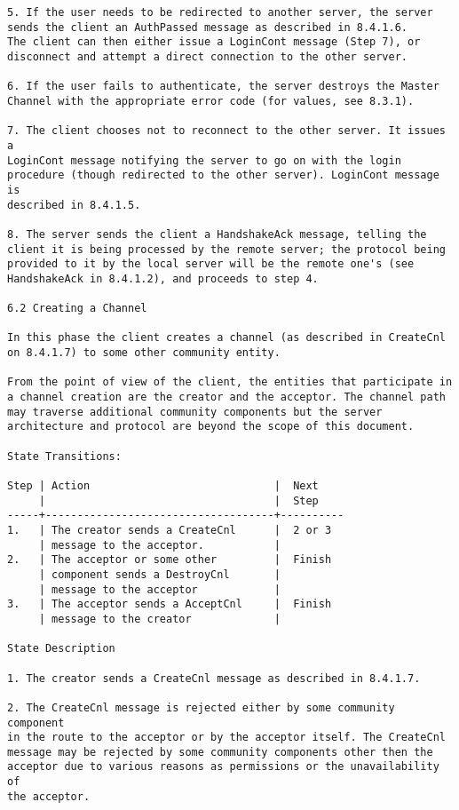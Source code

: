 \documentclass[titlepage,oneside]{book}
\begin{document}
\begin{verbatim}
5. If the user needs to be redirected to another server, the server
sends the client an AuthPassed message as described in 8.4.1.6.
The client can then either issue a LoginCont message (Step 7), or
disconnect and attempt a direct connection to the other server.

6. If the user fails to authenticate, the server destroys the Master
Channel with the appropriate error code (for values, see 8.3.1).

7. The client chooses not to reconnect to the other server. It issues a
LoginCont message notifying the server to go on with the login
procedure (though redirected to the other server). LoginCont message is
described in 8.4.1.5.

8. The server sends the client a HandshakeAck message, telling the
client it is being processed by the remote server; the protocol being
provided to it by the local server will be the remote one's (see
HandshakeAck in 8.4.1.2), and proceeds to step 4.

6.2 Creating a Channel

In this phase the client creates a channel (as described in CreateCnl
on 8.4.1.7) to some other community entity.

From the point of view of the client, the entities that participate in
a channel creation are the creator and the acceptor. The channel path
may traverse additional community components but the server
architecture and protocol are beyond the scope of this document.

State Transitions:

Step | Action                             |  Next
     |                                    |  Step
-----+------------------------------------+----------
1.   | The creator sends a CreateCnl      |  2 or 3
     | message to the acceptor.           |
2.   | The acceptor or some other         |  Finish
     | component sends a DestroyCnl       |
     | message to the acceptor            |
3.   | The acceptor sends a AcceptCnl     |  Finish
     | message to the creator             |

State Description

1. The creator sends a CreateCnl message as described in 8.4.1.7.

2. The CreateCnl message is rejected either by some community component
in the route to the acceptor or by the acceptor itself. The CreateCnl
message may be rejected by some community components other then the
acceptor due to various reasons as permissions or the unavailability of
the acceptor.


\end{verbatim}
\end{document}
